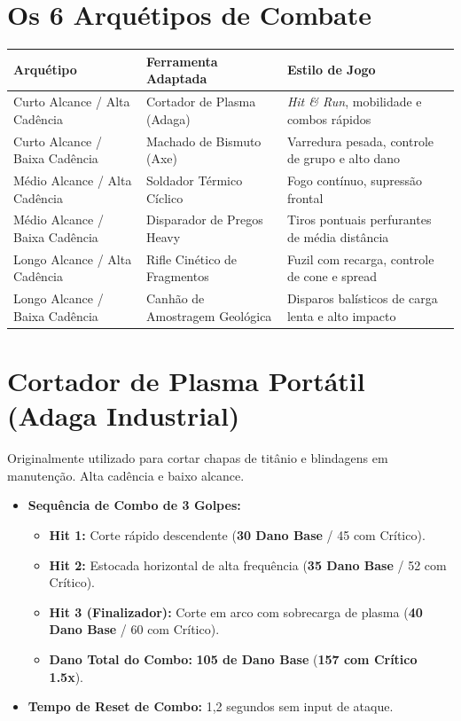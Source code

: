 \documentclass[a4paper,12pt]{report}
\begin{document}
\section{Os 6 Arquétipos de Combate}
\begin{center}
\begin{tabular}{|l|l|l|}
    \hline
    \textbf{Arquétipo} & \textbf{Ferramenta Adaptada} & \textbf{Estilo de Jogo} \\
    \hline
    Curto Alcance / Alta Cadência   & Cortador de Plasma (Adaga) & \textit{Hit \& Run}, mobilidade e combos rápidos \\
    Curto Alcance / Baixa Cadência  & Machado de Bismuto (Axe)    & Varredura pesada, controle de grupo e alto dano \\
    Médio Alcance / Alta Cadência   & Soldador Térmico Cíclico    & Fogo contínuo, supressão frontal \\
    Médio Alcance / Baixa Cadência  & Disparador de Pregos Heavy  & Tiros pontuais perfurantes de média distância \\
    Longo Alcance / Alta Cadência   & Rifle Cinético de Fragmentos & Fuzil com recarga, controle de cone e spread \\
    Longo Alcance / Baixa Cadência  & Canhão de Amostragem Geológica & Disparos balísticos de carga lenta e alto impacto \\
    \hline
\end{tabular}
\end{center}

\section{Cortador de Plasma Portátil (Adaga Industrial)}
Originalmente utilizado para cortar chapas de titânio e blindagens em manutenção. Alta cadência e baixo alcance.
\begin{itemize}
    \item \textbf{Sequência de Combo de 3 Golpes:}
    \begin{itemize}
        \item \textbf{Hit 1:} Corte rápido descendente (\textbf{30 Dano Base} / 45 com Crítico).
        \item \textbf{Hit 2:} Estocada horizontal de alta frequência (\textbf{35 Dano Base} / 52 com Crítico).
        \item \textbf{Hit 3 (Finalizador):} Corte em arco com sobrecarga de plasma (\textbf{40 Dano Base} / 60 com Crítico).
        \item \textbf{Dano Total do Combo:} \textbf{105 de Dano Base} (\textbf{157 com Crítico 1.5x}).
    \end{itemize}
    \item \textbf{Tempo de Reset de Combo:} 1,2 segundos sem input de ataque.
\end{itemize}
\end{document}
